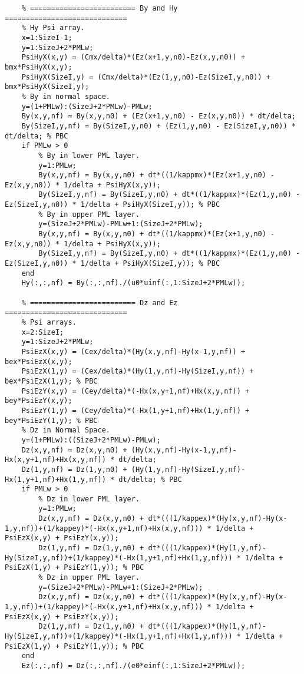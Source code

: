 \begin{lstlisting}
    % ========================= By and Hy =============================
    % Hy Psi array.
    x=1:SizeI-1;
    y=1:SizeJ+2*PMLw;
    PsiHyX(x,y) = (Cmx/delta)*(Ez(x+1,y,n0)-Ez(x,y,n0)) + bmx*PsiHyX(x,y);
    PsiHyX(SizeI,y) = (Cmx/delta)*(Ez(1,y,n0)-Ez(SizeI,y,n0)) + bmx*PsiHyX(SizeI,y);
    % By in normal space.
    y=(1+PMLw):(SizeJ+2*PMLw)-PMLw;
    By(x,y,nf) = By(x,y,n0) + (Ez(x+1,y,n0) - Ez(x,y,n0)) * dt/delta;
    By(SizeI,y,nf) = By(SizeI,y,n0) + (Ez(1,y,n0) - Ez(SizeI,y,n0)) * dt/delta; % PBC
    if PMLw > 0
        % By in lower PML layer.
        y=1:PMLw;
        By(x,y,nf) = By(x,y,n0) + dt*((1/kappmx)*(Ez(x+1,y,n0) - Ez(x,y,n0)) * 1/delta + PsiHyX(x,y));
        By(SizeI,y,nf) = By(SizeI,y,n0) + dt*((1/kappmx)*(Ez(1,y,n0) - Ez(SizeI,y,n0)) * 1/delta + PsiHyX(SizeI,y)); % PBC
        % By in upper PML layer.
        y=(SizeJ+2*PMLw)-PMLw+1:(SizeJ+2*PMLw);
        By(x,y,nf) = By(x,y,n0) + dt*((1/kappmx)*(Ez(x+1,y,n0) - Ez(x,y,n0)) * 1/delta + PsiHyX(x,y));
        By(SizeI,y,nf) = By(SizeI,y,n0) + dt*((1/kappmx)*(Ez(1,y,n0) - Ez(SizeI,y,n0)) * 1/delta + PsiHyX(SizeI,y)); % PBC
    end
    Hy(:,:,nf) = By(:,:,nf)./(u0*uinf(:,1:SizeJ+2*PMLw));

    % ========================= Dz and Ez =============================
    % Psi arrays.
    x=2:SizeI;
    y=1:SizeJ+2*PMLw;
    PsiEzX(x,y) = (Cex/delta)*(Hy(x,y,nf)-Hy(x-1,y,nf)) + bex*PsiEzX(x,y);
    PsiEzX(1,y) = (Cex/delta)*(Hy(1,y,nf)-Hy(SizeI,y,nf)) + bex*PsiEzX(1,y); % PBC
    PsiEzY(x,y) = (Cey/delta)*(-Hx(x,y+1,nf)+Hx(x,y,nf)) + bey*PsiEzY(x,y);
    PsiEzY(1,y) = (Cey/delta)*(-Hx(1,y+1,nf)+Hx(1,y,nf)) + bey*PsiEzY(1,y); % PBC
    % Dz in Normal Space.
    y=(1+PMLw):((SizeJ+2*PMLw)-PMLw);
    Dz(x,y,nf) = Dz(x,y,n0) + (Hy(x,y,nf)-Hy(x-1,y,nf)-Hx(x,y+1,nf)+Hx(x,y,nf)) * dt/delta;
    Dz(1,y,nf) = Dz(1,y,n0) + (Hy(1,y,nf)-Hy(SizeI,y,nf)-Hx(1,y+1,nf)+Hx(1,y,nf)) * dt/delta; % PBC
    if PMLw > 0
        % Dz in lower PML layer.
        y=1:PMLw;
        Dz(x,y,nf) = Dz(x,y,n0) + dt*(((1/kappex)*(Hy(x,y,nf)-Hy(x-1,y,nf))+(1/kappey)*(-Hx(x,y+1,nf)+Hx(x,y,nf))) * 1/delta + PsiEzX(x,y) + PsiEzY(x,y));
        Dz(1,y,nf) = Dz(1,y,n0) + dt*(((1/kappex)*(Hy(1,y,nf)-Hy(SizeI,y,nf))+(1/kappey)*(-Hx(1,y+1,nf)+Hx(1,y,nf))) * 1/delta + PsiEzX(1,y) + PsiEzY(1,y)); % PBC
        % Dz in upper PML layer.
        y=(SizeJ+2*PMLw)-PMLw+1:(SizeJ+2*PMLw);
        Dz(x,y,nf) = Dz(x,y,n0) + dt*(((1/kappex)*(Hy(x,y,nf)-Hy(x-1,y,nf))+(1/kappey)*(-Hx(x,y+1,nf)+Hx(x,y,nf))) * 1/delta + PsiEzX(x,y) + PsiEzY(x,y));
        Dz(1,y,nf) = Dz(1,y,n0) + dt*(((1/kappex)*(Hy(1,y,nf)-Hy(SizeI,y,nf))+(1/kappey)*(-Hx(1,y+1,nf)+Hx(1,y,nf))) * 1/delta + PsiEzX(1,y) + PsiEzY(1,y)); % PBC
    end
    Ez(:,:,nf) = Dz(:,:,nf)./(e0*einf(:,1:SizeJ+2*PMLw));


\end{lstlisting}
